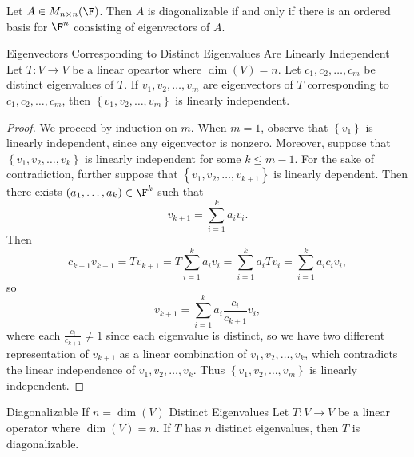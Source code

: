 \documentclass[linearalgebra]{subfiles}
\begin{document}
    \clearpage
    \begin{cor}{}
        Let $A\in M_{n\times n}(\F)$. Then $A$ is diagonalizable if and only if there is an ordered basis for $\F^n$ consisting of eigenvectors of $A$.
    \end{cor}	

    \begin{prop}{Eigenvectors Corresponding to Distinct Eigenvalues Are Linearly Independent}
        Let $T:V\to V$ be a linear opeartor where $\dim(V) = n$. Let $c_1, c_2, \ldots, c_m$ be distinct eigenvalues of $T$. If $v_1, v_2, \ldots, v_m$ are eigenvectors of $T$ corresponding to $c_1, c_2, \ldots, c_m$, then $\left\lbrace v_1, v_2, \ldots, v_m \right\rbrace$ is linearly independent.
    \end{prop}

    \begin{proof}
        We proceed by induction on $m$. When $m=1$, observe that $\left\lbrace v_1 \right\rbrace$ is linearly independent, since any eigenvector is nonzero. Moreover, suppose that $\left\lbrace v_1, v_2, \ldots, v_k \right\rbrace$ is linearly independent for some $k\leq m-1$. For the sake of contradiction, further suppose that $\left\lbrace v_1, v_2, \ldots, v_{k+1} \right\rbrace$ is linearly dependent. Then there exists $(a_1, \ldots, a_k)\in \F^k$ such that
        \begin{equation*}
            v_{k+1} = \sum^k_{i=1} a_iv_i.
        \end{equation*}
        Then
        \begin{equation*}
            c_{k+1}v_{k+1} = Tv_{k+1} = T \sum^k_{i=1} a_iv_i = \sum^k_{i=1} a_iTv_i = \sum^k_{i=1} a_ic_iv_i,
        \end{equation*}
        so
        \begin{equation*}
            v_{k+1} = \sum^k_{i=1} a_i \frac{c_i}{c_{k+1}} v_i,
        \end{equation*}
        where each $\frac{c_i}{c_{k+1}}\neq 1$ since each eigenvalue is distinct, so we have two different representation of $v_{k+1}$ as a linear combination of $v_1, v_2, \ldots, v_k$, which contradicts the linear independence of $v_1, v_2, \ldots, v_k$. Thus $\left\lbrace v_1, v_2, \ldots, v_m \right\rbrace$ is linearly independent.
    \end{proof}

    \begin{cor}{Diagonalizable If $n=\dim(V)$ Distinct Eigenvalues}
        Let $T:V\to V$ be a linear operator where $\dim(V) = n$. If $T$ has $n$ distinct eigenvalues, then $T$ is diagonalizable.
    \end{cor}
\end{document}
